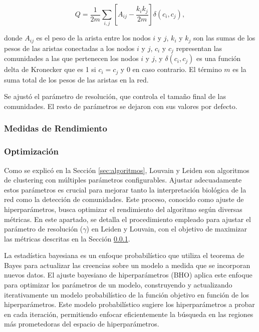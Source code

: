 \begin{equation}
	\label{eq:modularity}
	Q = \frac{1}{2m} \sum_{i,j} \left[ A_{ij} - \frac{k_i k_j}{2m} \right] \delta(c_i, c_j),
\end{equation}

\noindent donde \( A_{ij} \) es el peso de la arista entre los nodos \( i \) y \( j \), \( k_i \) y \( k_j \) son las sumas de los pesos de las aristas conectadas a los nodos \( i \) y \( j \), \( c_i \) y \( c_j \) representan las comunidades a las que pertenecen los nodos \( i \) y \( j \), y \( \delta(c_i, c_j) \) es una función delta de Kronecker que es 1 si \( c_i = c_j \) y 0 en caso contrario. El término \( m \) es la suma total de los pesos de las aristas en la red.

\noindent Se ajustó el parámetro de resolución, que controla el tamaño final de las comunidades. El resto de parámetros se dejaron con sus valores por defecto.

\subsubsection{Medidas de Rendimiento}
\label{sec:metricas}

\subsubsection{Optimización}

Como se explicó en la Sección \ref{sec:algoritmos}, Louvain y Leiden son algoritmos de clustering con múltiples parámetros configurables. Ajustar adecuadamente estos parámetros es crucial para mejorar tanto la interpretación biológica de la red como la detección de comunidades. Este proceso, conocido como ajuste de hiperparámetros, busca optimizar el rendimiento del algoritmo según diversas métricas. En este apartado, se detalla el procedimiento empleado para ajustar el parámetro de resolución (\(\gamma\)) en Leiden y Louvain, con el objetivo de maximizar las métricas descritas en la Sección \ref{sec:metricas}.

La estadística bayesiana es un enfoque probabilístico que utiliza el teorema de Bayes para actualizar las creencias sobre un modelo a medida que se incorporan nuevos datos. El ajuste bayesiano de hiperparámetros (BHO) aplica este enfoque para optimizar los parámetros de un modelo, construyendo y actualizando iterativamente un modelo probabilístico de la función objetivo en función de los hiperparámetros. Este modelo probabilístico sugiere los hiperparámetros a probar en cada iteración, permitiendo enfocar eficientemente la búsqueda en las regiones más prometedoras del espacio de hiperparámetros.

